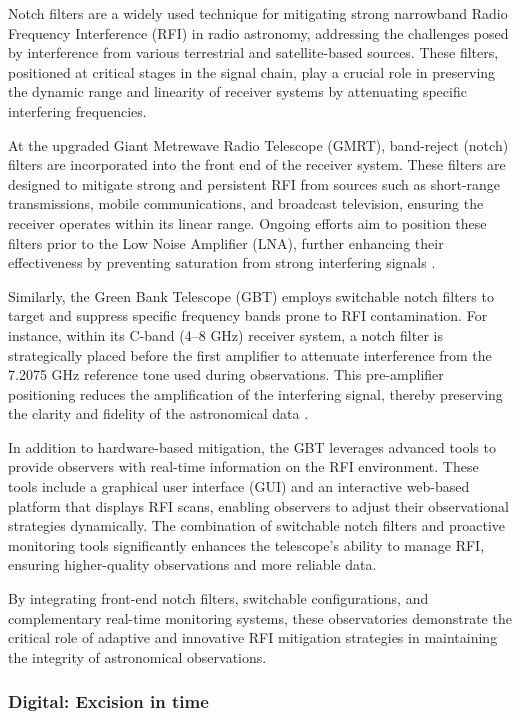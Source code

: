 Notch filters are a widely used technique for mitigating strong narrowband Radio Frequency Interference (RFI) in radio astronomy, addressing the challenges posed by interference from various terrestrial and satellite-based sources. These filters, positioned at critical stages in the signal chain, play a crucial role in preserving the dynamic range and linearity of receiver systems by attenuating specific interfering frequencies.

At the upgraded Giant Metrewave Radio Telescope (GMRT), band-reject (notch) filters are incorporated into the front end of the receiver system. These filters are designed to mitigate strong and persistent RFI from sources such as short-range transmissions, mobile communications, and broadcast television, ensuring the receiver operates within its linear range. Ongoing efforts aim to position these filters prior to the Low Noise Amplifier (LNA), further enhancing their effectiveness by preventing saturation from strong interfering signals \citep{sureshkumar2016rfi}.

Similarly, the Green Bank Telescope (GBT) employs switchable notch filters to target and suppress specific frequency bands prone to RFI contamination. For instance, within its C-band (4–8 GHz) receiver system, a notch filter is strategically placed before the first amplifier to attenuate interference from the 7.2075 GHz reference tone used during observations. This pre-amplifier positioning reduces the amplification of the interfering signal, thereby preserving the clarity and fidelity of the astronomical data \citep{gbt1}.

In addition to hardware-based mitigation, the GBT leverages advanced tools to provide observers with real-time information on the RFI environment. These tools include a graphical user interface (GUI) and an interactive web-based platform that displays RFI scans, enabling observers to adjust their observational strategies dynamically. The combination of switchable notch filters and proactive monitoring tools significantly enhances the telescope’s ability to manage RFI, ensuring higher-quality observations and more reliable data.

By integrating front-end notch filters, switchable configurations, and complementary real-time monitoring systems, these observatories demonstrate the critical role of adaptive and innovative RFI mitigation strategies in maintaining the integrity of astronomical observations.

\subsubsection{Digital: Excision in time}

